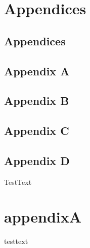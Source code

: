 \documentclass[12pt,a4paper]{report}      %
\begin{document}
\chapter{Appendices}\label{appendices-1}

\section{Appendices}\label{appendices-2}

\section{Appendix A}\label{appendix-a}

\section{Appendix B}\label{appendix-b}

\section{Appendix C}\label{appendix-c}

\section{Appendix D}\label{appendix-d}

TestText

\chapter{appendixA}\label{appendixa}

testtext


\end{document}
